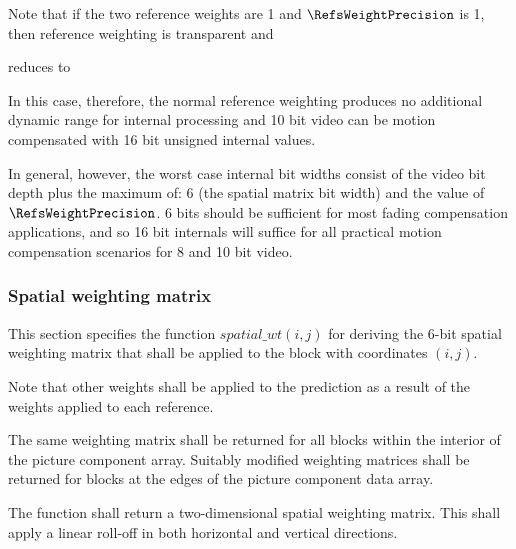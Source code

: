 \begin{informative}
Note that if the two reference weights are 1 and $\RefsWeightPrecision$ is 1, then
reference weighting is transparent and
\begin{pseudo*}
\bsCODE{\ldots}
\end{pseudo*}

reduces to

\begin{pseudo*}
\bsCODE{\ldots}
\end{pseudo*}

In this case, therefore, the normal reference weighting produces no additional dynamic
range for internal processing and 10 bit video can be motion compensated with 16 bit
unsigned internal values.

In general, however, the worst case internal bit widths consist of the video bit depth plus the maximum of: 6 (the spatial matrix bit width) and the value of $\RefsWeightPrecision$. 6 bits
should be sufficient for most fading compensation applications, and so 16 bit internals will
suffice for all practical motion compensation scenarios for 8 and 10 bit video.
\end{informative}


\subsubsection{Spatial weighting matrix}

\label{mcspatialweights}

This section specifies the function $spatial\_wt(i,j)$ for deriving the 6-bit spatial weighting 
matrix that shall be applied to the block with coordinates  $(i,j)$. 

Note that other weights shall be applied to the prediction as a result of the 
weights applied to each reference.

The same weighting matrix shall be returned for all blocks within the interior
of the picture component array. Suitably modified weighting matrices shall
be returned for blocks at the edges of the picture component data array.

The function shall return a two-dimensional spatial weighting matrix. This
shall apply a linear roll-off in both horizontal and vertical directions.

